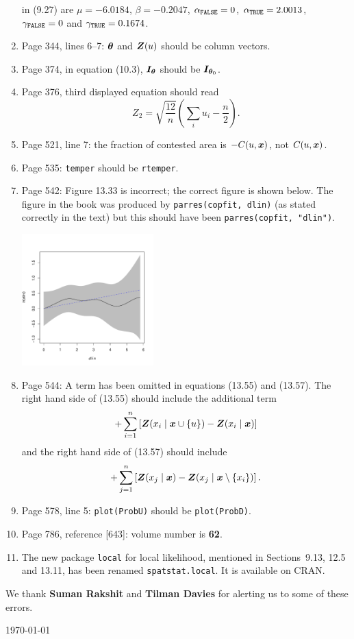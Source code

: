 \documentclass[12pt,a4paper]{article}
\newcommand{\boldmaths}[1]{{\ensuremath\boldsymbol{#1}}}
\newcommand{\bx}{\boldmaths x}
\newcommand{\bZ}{\boldmaths Z}
\newcommand{\btheta}{\boldmaths\theta}
\begin{document}
\begin{enumerate}
  in (9.27) are $\mu =-6.0184$, $\beta=-0.2047$,
  $\alpha_{\mbox{\scriptsize \texttt{FALSE}}} = 0$,
  $\alpha_{\mbox{\scriptsize \texttt{TRUE}}} = 2.0013$,
  $\gamma_{\mbox{\scriptsize \texttt{FALSE}}} = 0$ and
  $\gamma_{\mbox{\scriptsize \texttt{TRUE}}} = 0.1674$.
\item Page 344, lines 6--7: $\btheta$ and $\bZ(u)$ 
should be column vectors.
\item Page 374, in equation (10.3), ${\boldmaths I}_\btheta$
  should be ${\boldmaths I}_{\btheta_0}$.
\item Page 376, third displayed equation should read
  \[
       Z_2 = \sqrt{\frac{12}{n}} \left(\sum_i u_i - \frac n 2\right).
  \]
\item Page 521, line 7: the fraction of contested area is $-C(u, \bx)$,
not $C(u,\bx)$.
\item Page 535: \texttt{temper} should be \texttt{rtemper}.
  \pagebreak
\item Page 542: Figure 13.33 is incorrect; the correct figure is shown
  below. The figure in the book was produced by \texttt{parres(copfit, dlin)}
  (as stated correctly in the text)
  but this should have been \texttt{parres(copfit, "dlin")}.

  \centerline{\includegraphics*[width=0.4\textwidth]{fig1333}}
  
\item Page 544: A term has been omitted in equations (13.55) and (13.57).
The right hand side of (13.55) should include the additional term
\[
   + \sum_{i=1}^n \left[ \bZ(x_i \mid \bx \cup \{u\}) - \bZ(x_i \mid \bx) \right]
\]
and the right hand side of (13.57) should include
\[
  + \sum_{j=1}^n \left[ \bZ(x_j \mid \bx) - \bZ(x_j \mid \bx \setminus \{x_i\}) \right].
\]
\item Page 578, line 5: \texttt{plot(ProbU)} should be \texttt{plot(ProbD)}.
\item Page 786, reference [643]: volume number is \textbf{62}.
\item
  The new package \texttt{local} for local likelihood, mentioned
  in Sections~9.13, 12.5 and 13.11, has been renamed \texttt{spatstat.local}.
  It is available on CRAN.
\end{enumerate}

We thank \textbf{Suman Rakshit} and \textbf{Tilman Davies}
for alerting us to some of these errors.\\

\vspace*{\fill}


\hspace*{\fill} \today
\end{document}
